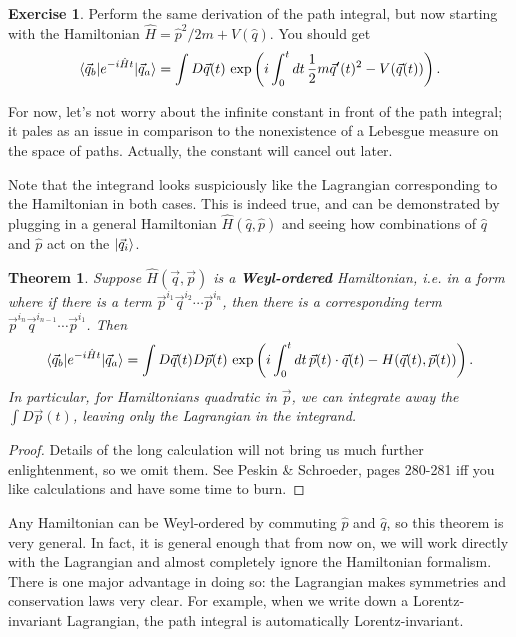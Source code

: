\documentclass{report}
\theoremstyle{plain}
\newtheorem{theorem}{Theorem}[section]
\theoremstyle{definition}
\newtheorem{exercise}{Exercise}[section]
\theoremstyle{remark}
\begin{document}
\begin{exercise}
  Perform the same derivation of the path integral, but now starting with the Hamiltonian $\hat{H} = \hat{p}^2/2m + V(\hat{q})$. You should get
  $$ \braket{\vec{q}_b|e^{-i\hat{H}t}|\vec{q}_a} = \int D\vec{q}(t) \, \exp\left(i \int_0^t dt \, \frac{1}{2} m \vec{q}'(t)^2 - V(\vec{q}(t))\right). $$
\end{exercise}

For now, let's not worry about the infinite constant in front of the
path integral; it pales as an issue in comparison to the nonexistence
of a Lebesgue measure on the space of paths. Actually, the constant
will cancel out later.

Note that the integrand looks suspiciously like the Lagrangian
corresponding to the Hamiltonian in both cases. This is indeed true,
and can be demonstrated by plugging in a general Hamiltonian
$\hat{H}(\hat{q}, \hat{p})$ and seeing how combinations of $\hat{q}$
and $\hat{p}$ act on the $\ket{\vec{q}_i}$.

\begin{theorem}
  Suppose $\hat{H}(\vec{q}, \vec{p})$ is a {\bf Weyl-ordered}
  Hamiltonian, i.e. in a form where if there is a term
  $\vec{p}^{i_1} \vec{q}^{i_2} \cdots \vec{p}^{i_n}$, then there is a
  corresponding term
  $\vec{p}^{i_n} \vec{q}^{i_{n-1}} \cdots \vec{p}^{i_1}$. Then
  $$ \braket{\vec{q}_b|e^{-i\hat{H}t}|\vec{q}_a} = \int D\vec{q}(t) D\vec{p}(t) \, \exp\left(i \int_0^t dt \, \vec{p}(t) \cdot \vec{q}(t) - H(\vec{q}(t), \vec{p}(t))\right). $$
  In particular, for Hamiltonians quadratic in $\vec{p}$, we can
  integrate away the $\int D\vec{p}(t)$, leaving only the Lagrangian
  in the integrand.
\end{theorem}

\begin{proof}
  Details of the long calculation will not bring us much further
  enlightenment, so we omit them. See Peskin \& Schroeder, pages
  280-281 iff you like calculations and have some time to burn.
\end{proof}

Any Hamiltonian can be Weyl-ordered by commuting $\hat{p}$ and
$\hat{q}$, so this theorem is very general. In fact, it is general
enough that from now on, we will work directly with the Lagrangian and
almost completely ignore the Hamiltonian formalism. There is one major
advantage in doing so: the Lagrangian makes symmetries and
conservation laws very clear. For example, when we write down a
Lorentz-invariant Lagrangian, the path integral is automatically
Lorentz-invariant.
\end{document}
